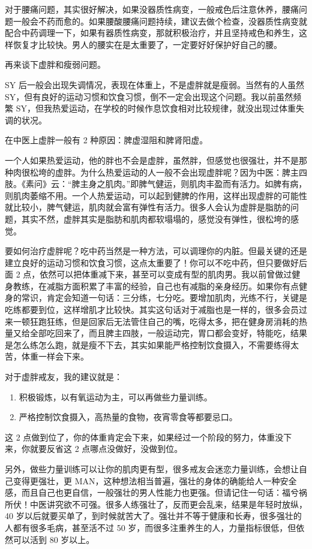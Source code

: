 \documentclass{ctexart}
\begin{document}
对于腰痛问题，其实很好解决，如果没器质性病变，一般戒色后注意休养，腰痛问题一般会不药而愈的。如果腰酸腰痛问题持续，建议去做个检查，没器质性病变就配合中药调理一下，如果有器质性病变，那就积极治疗，并且坚持戒色和养生，这样恢复才比较快。男人的腰实在是太重要了，一定要好好保护好自己的腰。

再来谈下虚胖和瘦弱问题。

SY 后一般会出现失调情况，表现在体重上，不是虚胖就是瘦弱。当然有的人虽然 SY，但有良好的运动习惯和饮食习惯，倒不一定会出现这个问题。我以前虽然频繁 SY，但我热爱运动，在学校的时候作息饮食相对比较规律，就没出现过体重失调的状况。

在中医上虚胖一般有 2 种原因：脾虚湿阻和脾肾阳虚。

一个人如果热爱运动，他的胖也不会是虚胖，虽然胖，但感觉也很强壮，并不是那种肉很松垮的虚胖。为什么热爱运动的人一般不会出现虚胖呢？因为中医：脾主四肢。《素问》云：“脾主身之肌肉。”即脾气健运，则肌肉丰盈而有活力。如脾有病，则肌肉萎缩不用。一个人热爱运动，可以起到健脾的作用，这样出现虚胖的可能性就比较小，脾气健运，肌肉就会富有弹性有活力。很多人会认为虚胖是脂肪的问题，其实不然，虚胖其实是脂肪和肌肉都软塌塌的，感觉没有弹性，很松垮的感觉。

要如何治疗虚胖呢？吃中药当然是一种方法，可以调理你的内脏。但最关键的还是建立良好的运动习惯和饮食习惯，这点太重要了！你可以不吃中药，但只要做好后面 2 点，依然可以把体重减下来，甚至可以变成有型的肌肉男。我以前曾做过健身教练，在减脂方面积累了丰富的经验，自己也有减脂的亲身经历。如果你有点健身的常识，肯定会知道一句话：三分练，七分吃。要增加肌肉，光练不行，关键是吃练都要到位，这样增肌才比较快。其实这句话对于减脂也是一样的，很多会员过来一顿狂跑狂练，但是回家后无法管住自己的嘴，吃得太多，把在健身房消耗的热量又给全部吃回来了，而且脾主四肢，一般运动完，胃口都会变好，特能吃，结果是怎么练怎么跑，就是瘦不下去，其实如果能严格控制饮食摄入，不需要练得太苦，体重一样会下来。

对于虚胖戒友，我的建议就是：

\begin{enumerate}
    \item 积极锻炼，以有氧运动为主，可以再做些力量训练。
    \item 严格控制饮食摄入，高热量的食物，夜宵零食等都要忌口。
\end{enumerate}

这 2 点做到位了，你的体重肯定会下来，如果经过一个阶段的努力，体重没下来，你就要反省这 2 点哪点没做好，没做到位。

另外，做些力量训练可以让你的肌肉更有型，很多戒友会迷恋力量训练，会想让自己变得更强壮，更 MAN，这种想法相当普遍，强壮的身体的确能给人一种安全感，而且自己也更自信，一般强壮的男人性能力也更强。但请记住一句话：福兮祸所伏！中医讲究欲不可强。很多人练强壮了，反而更会乱来，结果是年轻时放纵，40 岁以后就要买单了，到时候就苦大了。强壮并不等于健康和长寿，很多强壮的人都有很多毛病，甚至活不过 50 岁，而很多注重养生的人，力量指标很低，但依然可以活到 80 岁以上。
\end{document}
